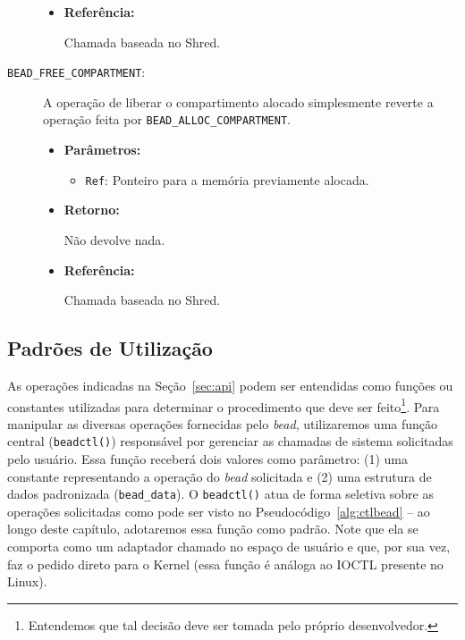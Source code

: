 \begin{description}
\begin{itemize}
    \item \textbf{Referência:}

Chamada baseada no Shred.

  \end{itemize}

  \item [\texttt{BEAD\_FREE\_COMPARTMENT}:]

A operação de liberar o compartimento alocado simplesmente reverte a operação
feita por \texttt{BEAD\_ALLOC\_COMPARTMENT}.

  \begin{itemize}
    \item \textbf{Parâmetros:}

    \begin{itemize}
      \item \texttt{Ref}: Ponteiro para a memória previamente alocada.
    \end{itemize}

    \item \textbf{Retorno:}

Não devolve nada.

    \item \textbf{Referência:}

Chamada baseada no Shred.

  \end{itemize}
\end{description}

\subsection{Padrões de Utilização}
\label{sec:padroes}

As operações indicadas na Seção~\ref{sec:api} podem ser entendidas como funções
ou constantes utilizadas para determinar o procedimento que deve ser
feito\footnote{Entendemos que tal decisão deve ser tomada pelo próprio
desenvolvedor.}. Para manipular as diversas operações fornecidas pelo
\emph{bead}, utilizaremos uma função central (\texttt{beadctl()}) responsável
por gerenciar as chamadas de sistema solicitadas pelo usuário. Essa função
receberá dois valores como parâmetro: (1) uma constante representando a
operação do \emph{bead} solicitada e (2) uma estrutura de dados padronizada
(\texttt{bead\_data}). O \texttt{beadctl()} atua de forma seletiva sobre as
operações solicitadas como pode ser visto no Pseudocódigo~\ref{alg:ctlbead} --
ao longo deste capítulo, adotaremos essa função como padrão. Note que ela se
comporta como um adaptador chamado no espaço de usuário e que, por sua vez, faz
o pedido direto para o Kernel (essa função é análoga ao IOCTL presente no
Linux).

